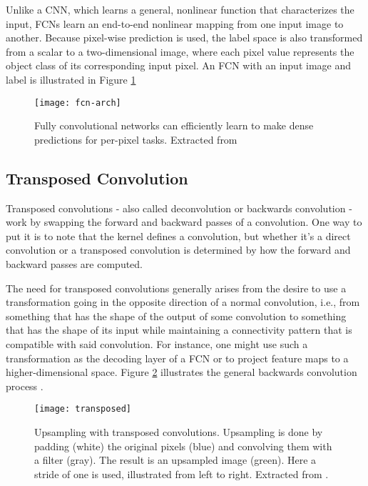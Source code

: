Unlike a CNN, which learns a general, nonlinear function that characterizes the input, FCNs learn an end-to-end nonlinear mapping from one input image to another. Because pixel-wise prediction is used, the label space is also transformed from a scalar to a two-dimensional image, where each pixel value represents the object class of its corresponding input pixel. An FCN with an input image and label is illustrated in Figure \ref{fcn-arch}


\begin{figure}[!htb]
\centering
\texttt{[image: fcn-arch]}
\caption{Fully convolutional networks can efficiently learn to make dense predictions for
per-pixel tasks. Extracted from \cite{long2015fully}}
\label{fcn-arch}
\end{figure}

\subsection{Transposed Convolution}

Transposed convolutions - also called deconvolution or backwards convolution - work
by swapping the forward and backward passes of a convolution. One way to put
it is to note that the kernel defines a convolution, but whether it’s a direct
convolution or a transposed convolution is determined by how the forward and
backward passes are computed.

The need for transposed convolutions generally arises from the desire to use a
transformation going in the opposite direction of a normal convolution, i.e., from
something that has the shape of the output of some convolution to something
that has the shape of its input while maintaining a connectivity pattern that
is compatible with said convolution. For instance, one might use such a transformation
as the decoding layer of a FCN or to project feature maps to a higher-dimensional space. Figure \ref{fig:transposed} illustrates the general backwards convolution process \cite{dumoulin2016guide}.

\begin{figure}[!htb]
\centering
\texttt{[image: transposed]}

\caption{Upsampling with transposed convolutions. Upsampling is done by padding
(white) the original pixels (blue) and convolving them with a filter (gray). The result is
an upsampled image (green). Here a stride of one is used, illustrated from left to right. Extracted from \cite{dumoulin2016guide}.} \label{fig:transposed}
\end{figure}

